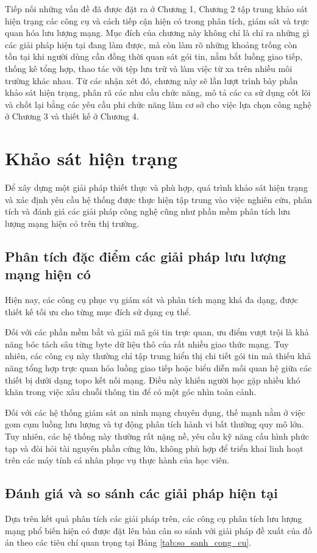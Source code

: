 \documentclass[../DoAn.tex]{subfiles}
\begin{document}
Tiếp nối những vấn đề đã được đặt ra ở Chương 1, Chương 2 tập trung khảo sát hiện trạng các công cụ và cách tiếp cận hiện có trong phân tích, giám sát và trực quan hóa lưu lượng mạng. Mục đích của chương này không chỉ là chỉ ra những gì các giải pháp hiện tại đang làm được, mà còn làm rõ những khoảng trống còn tồn tại khi người dùng cần đồng thời quan sát gói tin, nắm bắt luồng giao tiếp, thống kê tổng hợp, thao tác với tệp lưu trữ và làm việc từ xa trên nhiều môi trường khác nhau. Từ các nhận xét đó, chương này sẽ lần lượt trình bày phần khảo sát hiện trạng, phân rã các nhu cầu chức năng, mô tả các ca sử dụng cốt lõi và chốt lại bằng các yêu cầu phi chức năng làm cơ sở cho việc lựa chọn công nghệ ở Chương 3 và thiết kế ở Chương 4.
\section{Khảo sát hiện trạng}
Để xây dựng một giải pháp thiết thực và phù hợp, quá trình khảo sát hiện trạng và xác định yêu cầu hệ thống được thực hiện tập trung vào việc nghiên cứu, phân tích và đánh giá các giải pháp công nghệ cũng như phần mềm phân tích lưu lượng mạng hiện có trên thị trường.

\subsection{Phân tích đặc điểm các giải pháp lưu lượng mạng hiện có}
Hiện nay, các công cụ phục vụ giám sát và phân tích mạng khá đa dạng, được thiết kế tối ưu cho từng mục đích sử dụng cụ thể. 

Đối với các phần mềm bắt và giải mã gói tin trực quan, ưu điểm vượt trội là khả năng bóc tách sâu từng byte dữ liệu thô của rất nhiều giao thức mạng. Tuy nhiên, các công cụ này thường chỉ tập trung hiển thị chi tiết gói tin mà thiếu khả năng tổng hợp trực quan hóa luồng giao tiếp hoặc biểu diễn mối quan hệ giữa các thiết bị dưới dạng topo kết nối mạng. Điều này khiến người học gặp nhiều khó khăn trong việc xâu chuỗi thông tin để có một góc nhìn toàn cảnh.

Đối với các hệ thống giám sát an ninh mạng chuyên dụng, thế mạnh nằm ở việc gom cụm luồng lưu lượng và tự động phân tích hành vi bất thường quy mô lớn. Tuy nhiên, các hệ thống này thường rất nặng nề, yêu cầu kỹ năng cấu hình phức tạp và đòi hỏi tài nguyên phần cứng lớn, không phù hợp để triển khai linh hoạt trên các máy tính cá nhân phục vụ thực hành của học viên.

\subsection{Đánh giá và so sánh các giải pháp hiện tại}
Dựa trên kết quả phân tích các giải pháp trên, các công cụ phân tích lưu lượng mạng phổ biến hiện có được đặt lên bàn cân so sánh với giải pháp đề xuất của đồ án theo các tiêu chí quan trọng tại Bảng \ref{tab:so_sanh_cong_cu}.
\end{document}
